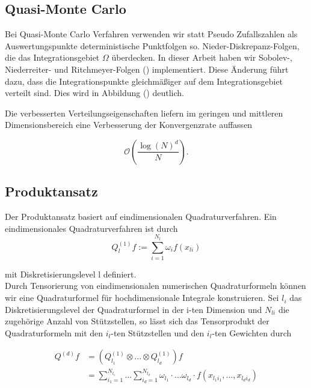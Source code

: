 \documentclass[12pt,a4paper]{scrartcl}
\numberwithin{equation}{section}
\begin{document}
{ \subsection{Quasi-Monte Carlo}
 
 Bei Quasi-Monte Carlo Verfahren verwenden wir statt Pseudo Zufallszahlen als Auswertungspunkte 
 deterministische Punktfolgen so. Nieder-Diskrepanz-Folgen, die das Integrationsgebiet $\Omega$
 überdecken. In dieser Arbeit haben wir Sobolev-, Niederreiter- und Ritchmeyer-Folgen () implementiert. 
 Diese Änderung führt dazu, dass die Integrationspunkte gleichmäßiger auf dem Integrationsgebiet verteilt sind.
 Dies wird in Abbildung () deutlich. 
 
 Die verbesserten Verteilungseigenschaften liefern im geringen und mittleren Dimensionsbereich eine Verbesserung 
 der Konvergenzrate auffassen
 
 \begin{equation}
  \mathcal{O}(\frac{\log(N)^d}{N}).
 \end{equation}
 
 \subsection{Produktansatz}
 
 Der Produktansatz basiert auf eindimensionalen Quadraturverfahren. Ein eindimensionales Quadraturverfahren ist durch
 \begin{equation}
  Q_l^{(1)}f := \sum_{i = 1}^{N_l} \omega_i f(x_{li}) 
 \end{equation}
 
 mit Diskretisierungslevel l definiert. \\
 Durch Tensorierung von eindimensionalen numerischen Quadraturformeln können wir eine Quadraturformel 
 für hochdimensionale Integrale konstruieren. 
 Sei $l_i$ das Diskretisierungslevel der Quadraturformel in der i-ten Dimension und $N_{li}$ die zugehörige 
 Anzahl von Stützstellen, so lässt sich das Tensorprodukt der Quadraturformeln mit den $i_l$-ten Stützstellen und den $i_l$-ten Gewichten durch 
 
 \begin{equation}
  \begin{split}
  Q^{(d)}f &=(Q_{l_1}^{(1)} \otimes ... \otimes Q_{l_d}^{(1)})f \\
  &= \sum_{i_1 = 1}^{N_{l_1}} ... \sum_{i_d = 1}^{N_{l_d}} \omega_{l_1} \cdot ... \omega_{l_d} \cdot f(x_{l_1 i_1},...,x_{l_d i_d}) \\
  \end{split}
 \end{equation}
 
}
\end{document}
